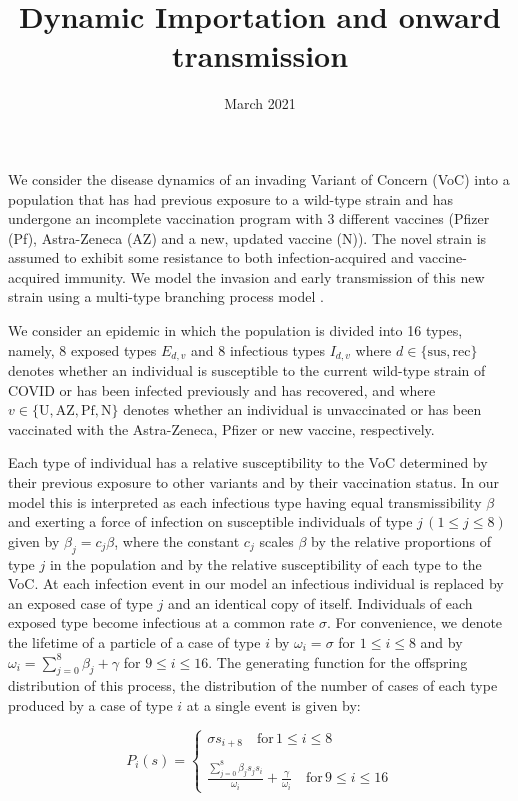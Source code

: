 \documentclass{article}
\title{Dynamic Importation and onward transmission}
\date{March 2021}
\begin{document}
\maketitle

We consider the disease dynamics of an invading Variant of Concern (VoC) into a population that has had previous exposure to a wild-type strain and has undergone an incomplete vaccination program with 3 different vaccines (Pfizer (Pf), Astra-Zeneca (AZ) and a new, updated vaccine (N)). The novel strain is assumed to exhibit some resistance to both infection-acquired and vaccine-acquired immunity. We model the invasion and early transmission of this new strain using a multi-type branching process model \cite{dorman2004garden}. 

We consider an epidemic in which the population is divided into 16 types, namely, 8 exposed types $E_{d, v}$ and 8 infectious types $I_{d, v}$ where $d \in \{\mathrm{sus, rec}\}$ denotes whether an individual is susceptible to the current wild-type strain of COVID or has been infected previously and has recovered,  and where $v\in\{ \mathrm{U, AZ, Pf, N}\}$ denotes whether an individual is unvaccinated or has been vaccinated with the Astra-Zeneca, Pfizer or new vaccine, respectively.

Each type of individual has a relative susceptibility to the VoC determined by their previous exposure to other variants and by their vaccination status. In our model this is interpreted as each infectious type having equal transmissibility $\beta$ and exerting a force of infection on susceptible individuals of type $j \, (1 \leq j \leq 8)$ given by $\beta_j = c_j \beta$, where the constant $c_j$ scales $\beta$ by the relative proportions of type $j$ in the population and by the relative susceptibility of each type to the VoC. At each infection event in our model an infectious individual is replaced by an exposed case of type $j$ and an identical copy of itself. Individuals of each exposed type become infectious at a common rate $\sigma$. For convenience, we denote the lifetime of a particle of a case of type $i$ by $\omega_i = \sigma$ for  $1 \leq i \leq 8$ and by $\omega_i = \sum_{j=0}^8 \beta_j + \gamma$ for $9 \leq i \leq 16$. The generating function for the offspring distribution of this process, the distribution of the number of cases of each type produced by a case of type $i$ at a single event is given by:


\begin{equation} \label{offspring}
P_i(s) =  \begin{cases}
\sigma s_{i+8} \quad \text{for} \, 1 \leq i \leq 8 \\
\\
\frac{\sum_{j=0}^8 \beta_j s_j s_i}{\omega_i} + \frac{\gamma}{\omega_i} \quad \text{for} \, 9 \leq i \leq 16 
\end{cases}
\end{equation}
\end{document}
